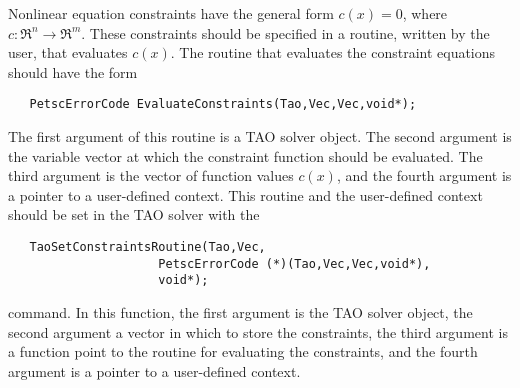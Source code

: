 Nonlinear equation constraints have the general form $c(x) = 0$, where 
$c: \Re^n \to \Re^m$.  These constraints should be specified in a routine, 
written by the user, that evaluates $c(x)$.  The routine that evaluates
the 
constraint equations should have the form
\begin{verbatim}
   PetscErrorCode EvaluateConstraints(Tao,Vec,Vec,void*);
\end{verbatim}
The first argument of this routine is a TAO solver object.  The
second argument is the variable vector at which the constraint function
should be evaluated.  
The third argument is the vector of function values $c(x)$, and the fourth
argument is a pointer to a user-defined context.  This routine and the 
user-defined context should be set in the TAO solver with the 
\begin{verbatim}
   TaoSetConstraintsRoutine(Tao,Vec,
                     PetscErrorCode (*)(Tao,Vec,Vec,void*),
                     void*);
\end{verbatim}
command. 
In this function, the first argument is the TAO solver object, the second 
argument a vector in which to store the constraints, the third argument is
a function point to the routine for evaluating the constraints, and the
fourth argument is a pointer to a user-defined context.

